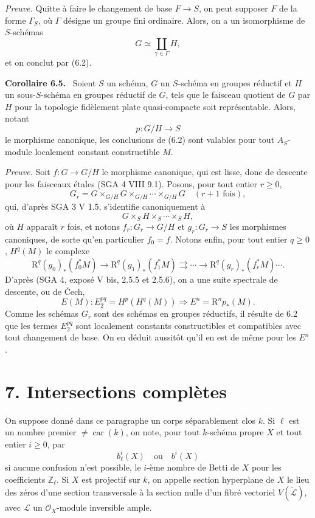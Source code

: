 \documentclass[11pt]{article}
\newenvironment{statement}[1]{\par\medskip\noindent\textbf{#1.}\ }{\par\medskip}
\newcommand{\R}{\mathrm{R}}\newcommand{\RHomCore}{\mathrm{RHom}}
\providecommand{\R}{\mathrm R}
\begin{document}
\emph{Preuve.} Quitte à faire le changement de base $F\to S$, on peut supposer $F$ de la forme $\Gamma_S$, où $\Gamma$ désigne un groupe fini ordinaire. Alors, on a un isomorphisme de $S$-schémas
\[
G\simeq\coprod_{\gamma\in\Gamma}H,
\]
et on conclut par (6.2).

\begin{statement}{Corollaire 6.5}
Soient $S$ un schéma, $G$ un $S$-schéma en groupes réductif et $H$ un sous-$S$-schéma en groupes réductif de $G$, tels que le faisceau quotient de $G$ par $H$ pour la topologie fidèlement plate quasi-compacte soit représentable. Alors, notant
\[
p:G/H\to S
\]
le morphisme canonique, les conclusions de (6.2) sont valables pour tout $A_S$-module localement constant constructible $M$.
\end{statement}

\emph{Preuve.} Soit $f:G\to G/H$ le morphisme canonique, qui est lisse, donc de descente pour les faisceaux étales (SGA 4 VIII 9.1). Posons, pour tout entier $r\ge0$,
\[
G_r=G\times_{G/H}G\times_{G/H}\cdots\times_{G/H}G
\quad(r+1\text{ fois}),
\]
qui, d'après SGA 3 V 1.5, s'identifie canoniquement à
\[
G\times_S H\times_S\cdots\times_S H,
\]
où $H$ apparaît $r$ fois, et notons $f_r:G_r\to G/H$ et $g_r:G_r\to S$ les morphismes canoniques, de sorte qu'en particulier $f_0=f$. Notons enfin, pour tout entier $q\ge0$, $H^q(M)$ le complexe
\[
\R^q(g_0)_*(f_0^*M)\to \R^q(g_1)_*(f_1^*M)\rightrightarrows\cdots\to \R^q(g_r)_*(f_r^*M)\cdots .
\]
D'après (SGA 4, exposé V bis, 2.5.5 et 2.5.6), on a une suite spectrale de descente, ou de Čech,
\[
E(M):E_2^{pq}=H^p(H^q(M))\Rightarrow E^n=\R^np_*(M).
\]
Comme les schémas $G_r$ sont des schémas en groupes réductifs, il résulte de 6.2 que les termes $E_2^{pq}$ sont localement constants constructibles et compatibles avec tout changement de base. On en déduit aussitôt qu'il en est de même pour les $E^n$.

\section*{7. Intersections complètes}

On suppose donné dans ce paragraphe un corps séparablement clos $k$. Si $\ell$ est un nombre premier $\ne\operatorname{car}(k)$, on note, pour tout $k$-schéma propre $X$ et tout entier $i\ge0$, par
\[
b_\ell^i(X)\quad\text{ou}\quad b^i(X)
\]
si aucune confusion n'est possible, le $i$-ème nombre de Betti de $X$ pour les coefficients $\mathbb Z_\ell$. Si $X$ est projectif sur $k$, on appelle section hyperplane de $X$ le lieu des zéros d'une section transversale à la section nulle d'un fibré vectoriel $V(\check{\mathcal L})$, avec $\mathcal L$ un $\mathcal O_X$-module inversible ample.
\end{document}
